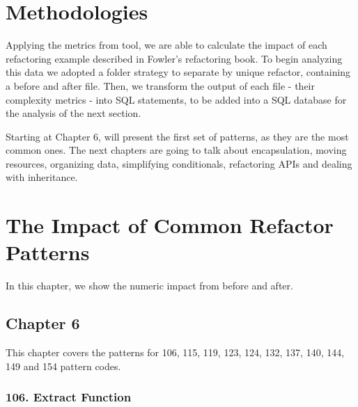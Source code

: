 \section{Methodologies}

Applying the metrics from \cite{article:mozilla} tool, we are able to calculate the impact of each refactoring example
described in Fowler's refactoring book. To begin analyzing this data we adopted a folder strategy to separate by unique refactor,
containing a before and after file. Then, we transform the output of each file - their complexity metrics - into SQL statements,
to be added into a SQL database for the analysis of the next section.

Starting at Chapter 6, \cite{book:refactoring} will present the first set of patterns, as they are the most common ones.
The next chapters are going to talk about encapsulation, moving resources, organizing data, simplifying conditionals,
refactoring APIs and dealing with inheritance.

\section{The Impact of Common Refactor Patterns}

In this chapter, we show the numeric impact from before and after.

\subsection{Chapter 6}

This chapter covers the patterns for 106, 115, 119, 123, 124, 132, 137, 140, 144, 149 and 154 pattern codes.
\subsubsection{ 106. Extract Function }

